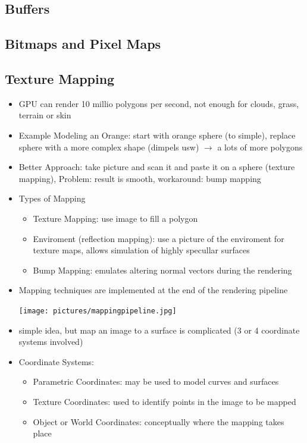 \documentclass[11pt,a4paper]{article}
\begin{document}
	\subsection{Buffers}
	\subsection{Bitmaps and Pixel Maps}
	\subsection{Texture Mapping}
	\begin{itemize}
		\item GPU can render 10 millio polygons per second, not enough for clouds, grass, terrain or skin
		\item Example Modeling an Orange: start with orange sphere (to simple), replace sphere with a more complex shape (dimpels usw) $\rightarrow$ a lots of more polygons
		\item Better Approach: take picture and scan it and paste it on a sphere (texture mapping), Problem: result is smooth, workaround: bump mapping
		\item Types of Mapping
			\begin{itemize}
				\item Texture Mapping: use image to fill a polygon
				\item Enviroment (reflection mapping): use a picture of the enviroment for texture maps, allows simulation of highly specullar surfaces
				\item Bump Mapping: emulates altering normal vectors during the rendering
			\end{itemize}
		\item Mapping techniques are implemented at the end of the rendering pipeline
		\begin{center}
			\texttt{[image: pictures/mappingpipeline.jpg]}
		\end{center}
		\item simple idea, but map an image to a surface is complicated (3 or 4 coordinate systems involved)
		\item Coordinate Systems:
			\begin{itemize}
				\item Parametric Coordinates: may be used to model curves and surfaces
				\item Texture Coordinates: used to identify points in the image to be mapped
				\item Object or World Coordinates: conceptually where the mapping takes place

\end{itemize}
\end{itemize}
\end{document}
